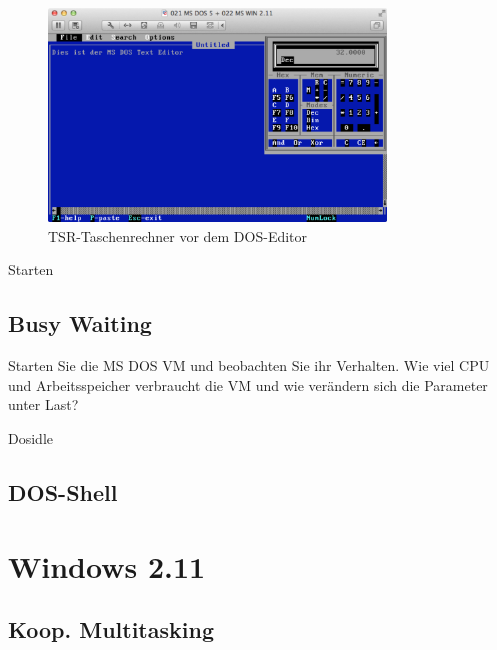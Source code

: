 	\begin{figure}[h]
		\begin{center}
			\includegraphics[width=0.8\textwidth]{img/dostsr}
			\caption{TSR-Taschenrechner vor dem DOS-Editor}
			\label{fig:screenshot-dostsr}
		\end{center}
	\end{figure}

	

	Starten 

	\subsection{Busy Waiting}
	
	Starten Sie die MS DOS VM und beobachten Sie ihr Verhalten.
	Wie viel CPU und Arbeitsspeicher verbraucht die VM und wie verändern sich die Parameter unter Last?

	Dosidle

	\subsection{DOS-Shell}

\section{Windows 2.11}

	\subsection{Koop. Multitasking}


